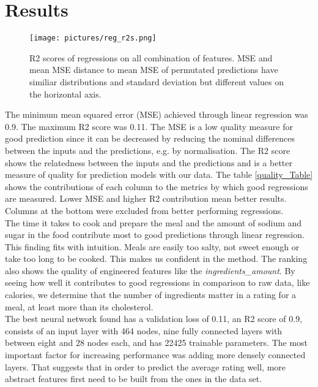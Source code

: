 \documentclass{article}
\begin{document}
\section{Results}
\begin{wrapfigure}{R}{0.55\textwidth}
    \centering
    \texttt{[image: pictures/reg\_r2s.png]}
    \caption{R2 scores of regressions on all combination of features. MSE and mean MSE distance to mean MSE of permutated predictions have similiar distributions and standard deviation but different values on the horizontal axis.}
\end{wrapfigure}
The minimum mean squared error (MSE) achieved through linear regression was 0.9. The maximum R2 score was 0.11. The MSE is a low quality measure for good prediction since it can be decreased by reducing the nominal differences between the inputs and the predictions, e.g. by normalisation. The R2 score shows the relatedness between the inputs and the predictions and is a better measure of quality for prediction models with our data. The table \ref{quality_Table} shows the contributions of each column to the metrics by which good regressions are measured. Lower MSE and higher R2 contribution mean better results. Columns at the bottom were excluded from better performing regressions.\\
The time it takes to cook and prepare the meal and the amount of sodium and sugar in the food contribute most to good predictions through linear regression. This finding fits with intuition. Meals are easily too salty, not sweet enough or take too long to be cooked. This makes us confident in the method. The ranking also shows the quality of engineered features like the \textit{ingredients\_amount}. By seeing how well it contributes to good regressions in comparison to raw data, like calories, we determine that the number of ingredients matter in a rating for a meal, at least more than its cholesterol. \\
The best neural network found has a validation loss of 0.11, an R2 score of 0.9, consists of an input layer with 464 nodes, nine fully connected layers with between eight and 28 nodes each, and has 22425 trainable parameters. The most important factor for increasing performance was adding more densely connected layers. That suggests that in order to predict the average rating well, more abstract features first need to be built from the ones in the data set.  
\end{document}
